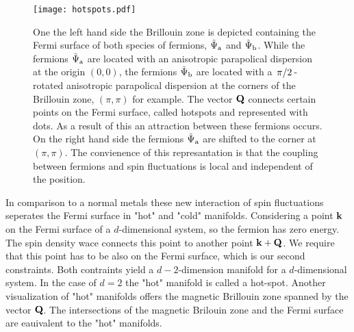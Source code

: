 \begin{figure}
	\centering
	\texttt{[image: hotspots.pdf]}
	\caption{
One the left hand side the Brillouin zone is depicted containing the Fermi surface of both species of fermions, $\tilde{\Psi}_{\mathrm{a}}$ and $\tilde{\Psi}_{\mathrm{b}}$.
While the fermions $\tilde{\Psi}_{\mathrm{a}}$ are located with an anisotropic parapolical dispersion at the origin $(0,0)$, the fermions $\tilde{\Psi}_{\mathrm{b}}$ are located with a $\flatfrac{\pi}{2}$-rotated anisotropic parapolical dispersion at the corners of the Brillouin zone, $(\pi,\pi)$ for example.
The vector $\vb{Q}$ connects certain points on the Fermi surface, called hotspots and represented with dots. 
As a result of this an attraction between these fermions occurs.
On the right hand side the fermions $\tilde{\Psi}_{\mathrm{a}}$ are shifted to the corner at $(\pi,\pi)$.
The convienence of this represantation is that the coupling between fermions and spin fluctuations is local and independent of the position.
	}
	\label{fig:hotspots}
\end{figure}
%
In comparison to a normal metals these new interaction of spin fluctuations seperates the Fermi surface in "hot" and "cold" manifolds.
Considering a point $\vb{k}$ on the Fermi surface of a $d$-dimensional system, so the fermion has zero energy.
The spin density wace connects this point to another point $\vb{k}+\vb{Q}$.
We require that this point has to be also on the Fermi surface, which is our second constraints.
Both contraints yield a $d-2$-dimension manifold for a $d$-dimensional system.
In the case of $d=2$ the "hot" manifold is called a hot-spot.
Another visualization of "hot" manifolds offers the magnetic Brillouin zone spanned by the vector $\vb{Q}$.
The intersections of the magnetic Brilouin zone and the Fermi surface are eauivalent to the "hot" manifolds.

